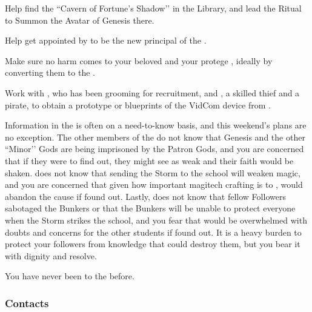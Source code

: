 \documentclass[char]{GL2020}
\begin{document}
\begin{itemz}
    \item Help \cChupSecond{} find the ``Cavern of Fortune’s Shadow’’ in the Library, and lead the Ritual to Summon the Avatar of Genesis there.
     \item Help \cChupSecond{} get appointed by \cPrincipal{} to be the new principal of the \pSchool{}.
    \item Make sure no harm comes to your beloved \cCurse{\auncle} \cCurse{} and your protege \cPirateChild{}, ideally by converting them to the \pGoaties{}.
    \item Work with \cChupInventor{}, who has been grooming \cTechStar{} for recruitment, and \cPirateChild{}, a skilled thief and a pirate, to obtain a prototype or blueprints of the VidCom device from \cTechStar{}.
\end{itemz}

\begin{itemz}[Notes]
    \item Information in the \pGoaties{} is often on a need-to-know basis, and this weekend’s plans are no exception. The other members of the \pGoaties{} do not know that Genesis and the other ``Minor’’ Gods are being imprisoned by the Patron Gods, and you are concerned that if they were to find out, they might see \cGenesis{} as weak and their faith would be shaken. \cChupInventor{} does not know that sending the Storm to the school will weaken magic, and you are concerned that given how important magitech crafting is to \cChupInventor{\them}, \cChupInventor{\they} would abandon the cause if \cChupInventor{\they} found out. Lastly, \cChupStudent{} does not know that \cChupStudent{\their} fellow Followers sabotaged the Bunkers or that the Bunkers will be unable to protect everyone when the Storm strikes the school, and you fear that \cChupStudent{\they} would be overwhelmed with doubts and concerns for the other students if \cChupStudent{\they} found out. It is a heavy burden to protect your followers from knowledge that could destroy them, but you bear it with dignity and resolve.
    \item You have never been to the \pSchool{} before.
\end{itemz}

\subsubsection*{Contacts}
\begin{contacts}
    \contact{\cInterpol{}}
    \contact{\cChupAvenger{}}
    \contact{\cWildCard{}}
\end{contacts}
\end{document}
